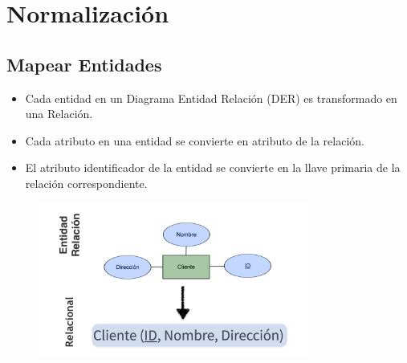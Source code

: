 \documentclass[12pt, fleqn]{report}                             %
\begin{document}
        \clearpage
        \section{Normalización}

            
            \subsection{Mapear Entidades}

                \begin{itemize}
                    \item Cada entidad en un Diagrama Entidad Relación (DER) es transformado en
                        una Relación.

                    \item Cada atributo en una entidad se convierte en atributo de la relación.

                    \item El atributo identificador de la entidad se convierte en la llave primaria
                        de la relación correspondiente.
                \end{itemize}

                \begin{figure}[h]
                    \centering
                    \includegraphics[width=0.8\textwidth]{NormalizacionEntidad}
                \end{figure}


            \clearpage
\end{document}
